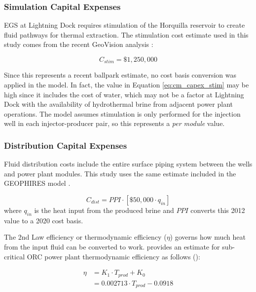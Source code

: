\subsubsection{Simulation Capital Expenses}\label{ch4:cm_stim}
EGS at Lightning Dock requires stimulation of the Horquilla reservoir to create fluid pathways for thermal extraction. The stimulation cost estimate used in this study comes from the recent GeoVision analysis \citep{lowry_geovision_2017}:

\begin{equation}
\label{eq:cm_capex_stim}
    C_{stim} = \$1,250,000
\end{equation}

Since this represents a recent ballpark estimate, no cost basis conversion was applied in the model. In fact, the value in Equation \ref{eq:cm_capex_stim} may be high since it includes the cost of water, which may not be a factor at Lightning Dock with the availability of hydrothermal brine from adjacent power plant operations. The model assumes stimulation is only performed for the injection well in each injector-producer pair, so this represents a \textit{per module} value.

\subsubsection{Distribution Capital Expenses}\label{ch4:cm_capex_dist}
Fluid distribution costs include the entire surface piping system between the wells and power plant modules. This study uses the same estimate included in the GEOPHIRES model \citep{beckers_introducing_2013}.

\begin{equation}
\label{eq:cm_dist}
    C_{dist} = PPI \cdot \left[ \$50,000 \cdot q_{in} \right]
\end{equation}
where $q_{in}$ is the heat input from the produced brine and $PPI$ converts this 2012 value to a 2020 cost basis. 

The 2nd Law efficiency or thermodynamic efficiency ($\eta$) governs how much heat from the input fluid can be converted to work. \citeauthor{beckers_low-temperature_2016} provides an estimate for sub-critical ORC power plant thermodynamic efficiency as follows (\citeyear[p.\ 39-41]{beckers_low-temperature_2016}):

\begin{equation}
\begin{aligned}
    \label{eq:2ndlaw_eff}
    \eta &= K_1 \cdot T_{prod} + K_0 \\
         &= 0.002713 \cdot T_{prod} - 0.0918
\end{aligned}
\end{equation}

